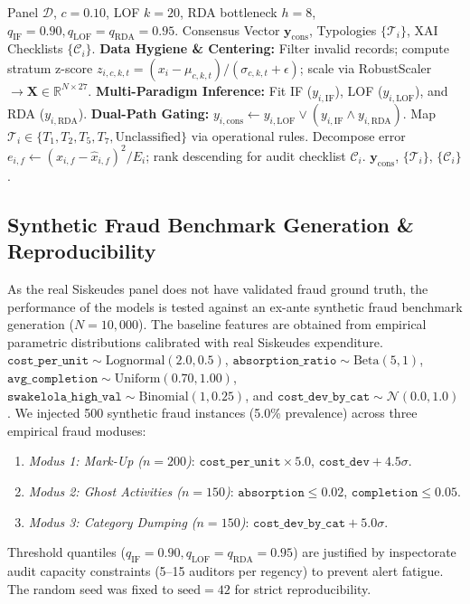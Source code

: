 \documentclass[conference]{IEEEtran}
\begin{document}
\begin{algorithm}[htbp]
\caption{Dual-Path Anomaly Detection and XAI Policy Pipeline}
\label{alg:end_to_end}
\begin{algorithmic}[1]
\footnotesize
\REQUIRE Panel $\mathcal{D}$, $c=0.10$, LOF $k=20$, RDA bottleneck $h=8$, $q_{\text{IF}}=0.90, q_{\text{LOF}}=q_{\text{RDA}}=0.95$.
\ENSURE Consensus Vector $\mathbf{y}_{\text{cons}}$, Typologies $\{\mathcal{T}_i\}$, XAI Checklists $\{\mathcal{C}_i\}$.
\STATE \textbf{Data Hygiene \& Centering:} Filter invalid records; compute stratum z-score $z_{i,c,k,t} = (x_i - \mu_{c,k,t})/(\sigma_{c,k,t}+\epsilon)$; scale via RobustScaler $\to \mathbf{X} \in \mathbb{R}^{N \times 27}$.
\STATE \textbf{Multi-Paradigm Inference:} Fit IF ($y_{i,\text{IF}}$), LOF ($y_{i,\text{LOF}}$), and RDA ($y_{i,\text{RDA}}$).
\STATE \textbf{Dual-Path Gating:} $y_{i, \text{cons}} \leftarrow y_{i, \text{LOF}} \lor (y_{i, \text{IF}} \land y_{i, \text{RDA}})$.
    \STATE Map $\mathcal{T}_i \in \{T_1, T_2, T_5, T_7, \text{Unclassified}\}$ via operational rules.
    \STATE Decompose error $e_{i,f} \leftarrow (x_{i,f} - \hat{x}_{i,f})^2 / E_i$; rank descending for audit checklist $\mathcal{C}_i$.
\ENDFOR
\RETURN $\mathbf{y}_{\text{cons}}$, $\{\mathcal{T}_i\}$, $\{\mathcal{C}_i\}$.
\end{algorithmic}
\end{algorithm}

\subsection{Synthetic Fraud Benchmark Generation \& Reproducibility}

As the real Siskeudes panel does not have validated fraud ground truth, the performance of the models is tested against an ex-ante synthetic fraud benchmark generation ($N = 10,000$). The baseline features are obtained from empirical parametric distributions calibrated with real Siskeudes expenditure. $\texttt{cost\_per\_unit} \sim \text{Lognormal}(2.0, 0.5)$, $\texttt{absorption\_ratio} \sim \text{Beta}(5, 1)$, $\texttt{avg\_completion} \sim \text{Uniform}(0.70, 1.00)$, $\texttt{swakelola\_high\_val} \sim \text{Binomial}(1, 0.25)$, and $\texttt{cost\_dev\_by\_cat} \sim \mathcal{N}(0.0, 1.0)$. We injected 500 synthetic fraud instances (5.0\% prevalence) across three empirical fraud moduses:
\begin{enumerate}
    \item \textit{Modus 1: Mark-Up ($n=200$)}: $\texttt{cost\_per\_unit} \times 5.0$, $\texttt{cost\_dev} + 4.5\sigma$.
    \item \textit{Modus 2: Ghost Activities ($n=150$)}: $\texttt{absorption} \le 0.02$, $\texttt{completion} \le 0.05$.
    \item \textit{Modus 3: Category Dumping ($n=150$)}: $\texttt{cost\_dev\_by\_cat} + 5.0\sigma$.
\end{enumerate}
Threshold quantiles ($q_{\text{IF}}=0.90, q_{\text{LOF}}=q_{\text{RDA}}=0.95$) are justified by inspectorate audit capacity constraints (5--15 auditors per regency) to prevent alert fatigue. The random seed was fixed to $\text{seed} = 42$ for strict reproducibility.
\end{document}
